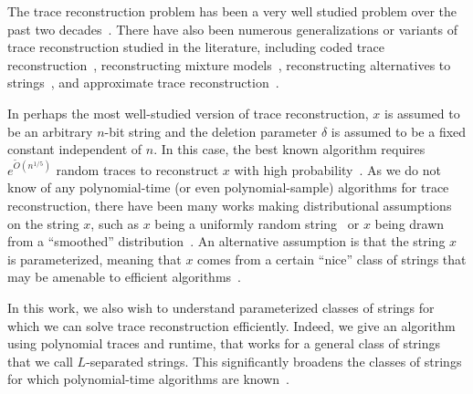 \documentclass[12pt]{article}
\theoremstyle{definition}
\theoremstyle{remark}
\begin{document}
The trace reconstruction problem has been a very well studied problem over the past two decades~\cite{Levenshtein01a, Levenshtein01b, BatuKKM04, KannanM05, HolensteinMPW08, ViswanathanS08, McGregorPV14, DeOS17, NazarovP17, PeresZ17, HartungHP18, HoldenL18, HoldenPP18, Chase21a, ChenDLSS21a, ChenDLSS21b, Chase21b, Rubinstein23}.
There have also been numerous generalizations or variants of trace reconstruction studied in the literature, including coded trace reconstruction~\cite{CheraghchiGMR19, BrakensiekLS19}, reconstructing mixture models~\cite{BanCFSS19, BanCSS19, Narayanan21}, reconstructing alternatives to strings~\cite{DaviesRR19, KrishnamurthyMMP21, NarayananR21, McGregorS22, SunY23, McGregorS24}, and approximate trace reconstruction~\cite{DaviesRSR21, ChaseP21, ChakrabortyDK21, ChenDLSS22, ChenDLSS23}.

In perhaps the most well-studied version of trace reconstruction, $x$ is assumed to be an arbitrary $n$-bit string and the deletion parameter $\delta$ is assumed to be a fixed constant independent of $n$. In this case, the best known algorithm requires $e^{\tilde{O}(n^{1/5})}$ random traces to reconstruct $x$ with high probability~\cite{Chase21b}. As we do not know of any polynomial-time (or even polynomial-sample) algorithms for trace reconstruction, there have been many works making distributional assumptions on the string $x$, such as $x$ being a uniformly random string~\cite{HolensteinMPW08, McGregorPV14, PeresZ17, HoldenPP18, Rubinstein23} or $x$ being drawn from a ``smoothed'' distribution~\cite{ChenDLSS21a}.
An alternative assumption is that the string $x$ is parameterized, meaning that $x$ comes from a certain ``nice'' class of strings that may be amenable to efficient algorithms~\cite{KrishnamurthyMMP21, DaviesRSR21}.

In this work, we also wish to understand parameterized classes of strings for which we can solve trace reconstruction efficiently. Indeed, we give an algorithm using polynomial traces and runtime, that works for a general class of strings that we call $L$-separated strings. This significantly broadens the classes of strings for which polynomial-time algorithms are known~\cite{KrishnamurthyMMP21}.
\end{document}

